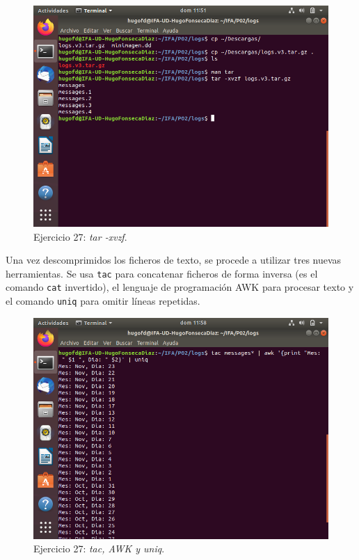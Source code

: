 \documentclass[11pt]{article}
\begin{document}
\begin{figure}[H]
    \caption{Ejercicio 27: \textit{tar -xvzf}.}
  \centering
  \includegraphics[scale=0.7, trim={0 7cm 0 0}, clip]{p02/e27-1.png}
\end{figure}

Una vez descomprimidos los ficheros de texto, se procede a utilizar tres nuevas herramientas. Se usa \verb|tac| para concatenar ficheros de forma inversa (es el comando \verb|cat| invertido), el lenguaje de programación AWK para procesar texto y el comando \verb|uniq| para omitir líneas repetidas.

\begin{figure}[H]
    \caption{Ejercicio 27: \textit{tac, AWK y uniq}.}
  \centering
  \includegraphics[scale=0.7]{p02/e27-2.png}
\end{figure}
\end{document}
